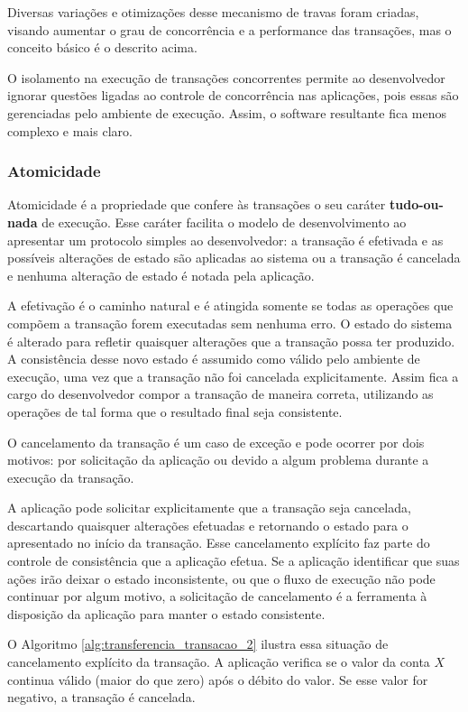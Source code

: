 \documentclass[11pt,twoside,a4paper]{book}
\begin{document}
Diversas variações e otimizações desse mecanismo de travas foram criadas, visando aumentar o grau de concorrência e a performance das transações, mas o conceito básico é o descrito acima.

O isolamento na execução de transações concorrentes permite ao desenvolvedor ignorar questões ligadas ao controle de concorrência nas aplicações, pois essas são gerenciadas pelo ambiente de execução. Assim, o software resultante fica menos complexo e mais claro.

\subsubsection*{Atomicidade}
Atomicidade é a propriedade que confere às transações o seu caráter \textbf{tudo-ou-nada} de execução. Esse caráter facilita o modelo de desenvolvimento ao apresentar um protocolo simples ao desenvolvedor: a transação é efetivada e as possíveis alterações de estado são aplicadas ao sistema ou a transação é cancelada e nenhuma alteração de estado é notada pela aplicação. 

A efetivação é o caminho natural e é atingida somente se todas as operações que compõem a transação forem executadas sem nenhuma erro. O estado do sistema é alterado para refletir quaisquer alterações que a transação possa ter produzido. A consistência desse novo estado é assumido como válido pelo ambiente de execução, uma vez que a transação não foi cancelada explicitamente. Assim fica a cargo do desenvolvedor compor a transação de maneira correta, utilizando as operações de tal forma que o resultado final seja consistente.

O cancelamento da transação é um caso de exceção e pode ocorrer por dois motivos: por solicitação da aplicação ou devido a algum problema durante a execução da transação. 

A aplicação pode solicitar explicitamente que a transação seja cancelada, descartando quaisquer alterações efetuadas e retornando o estado para o apresentado no início da transação. Esse cancelamento explícito faz parte do controle de consistência que a aplicação efetua. Se a aplicação identificar que suas ações irão deixar o estado inconsistente, ou que o fluxo de execução não pode continuar por algum motivo, a solicitação de cancelamento é a ferramenta à disposição da aplicação para manter o estado consistente.

O Algoritmo \ref{alg:transferencia_transacao_2} ilustra essa situação de cancelamento explícito da transação. A aplicação verifica se o valor da conta $X$ continua válido (maior do que zero) após o débito do valor. Se esse valor for negativo, a transação é cancelada.
\end{document}
